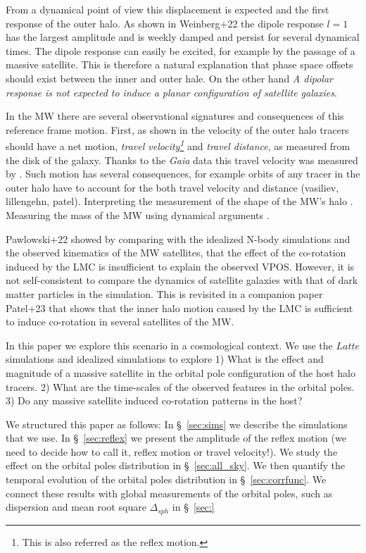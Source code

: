 \documentclass{aastex63}
\newcommand{\latte}{$Latte$}
\begin{document}
From a dynamical point of view this displacement is expected and the first response of the outer halo. As shown in Weinberg+22 the dipole response $l=1$ has the largest amplitude and is weekly damped and persist for several dynamical times. The dipole response can easily be excited, for example by the passage of a massive satellite. This is therefore a natural explanation that phase space offsets should exist between the inner and outer hale. On the other hand {\textit{A dipolar response is not expected to induce a planar configuration of satellite galaxies}}. 


In the MW there are several observational signatures and consequences of this reference frame motion. First, as shown in \cite{garavito-camargo19a, Petersen19-disk}
the velocity of the outer halo tracers should have a net motion, {\textit{travel velocity\footnote{This is also referred as the reflex motion.}}} and {\textit{travel distance}}, as measured from the disk of the galaxy. Thanks to the {\textit{Gaia}} data this travel velocity was measured by \cite{Peterson20, Erkal20b}. Such motion has several consequences, for example orbits of any tracer in the outer halo have to account for the both travel velocity and distance (vasiliev, lillengehn, patel).  Interpreting the measurement of the shape of the MW's halo \citep{GC20}. Measuring the mass of the MW using dynamical arguments \cite{Erktal, Chamberlain}. 

Pawlowski+22 showed by comparing with the idealized N-body simulations and the
observed kinematics of the MW satellites, that the effect of the co-rotation
induced by the LMC is insufficient to explain the observed VPOS. However, it is
not self-consistent to compare the dynamics of satellite galaxies with that of
dark matter particles in the simulation. This is revisited in a companion paper Patel+23 that shows that the inner halo motion caused by the LMC is sufficient to induce co-rotation in several satellites of the MW. 


In this paper we explore this scenario in a cosmological context. We use 
the \latte simulations and idealized simulations to explore 1) What is 
the effect and magnitude  of a massive satellite in the orbital pole 
configuration of the host halo tracers. 2) What are the time-scales of 
the observed features in the orbital poles. 3) Do any massive satellite induced
co-rotation patterns in the host? 

We structured this paper as follows: In \S~\ref{sec:sims} we describe the
simulations that we use. In \S~\ref{sec:reflex} we present the amplitude of 
the reflex motion (we need to decide how to call it, reflex motion or travel velocity!).
We study the effect on the orbital poles distribution in \S~\ref{sec:all_sky}. We then 
quantify the temporal evolution of the orbital poles distribution in \S~\ref{sec:corrfunc}. 
We connect these results with global measurements of the orbital poles, such as dispersion and 
mean root square $\Delta_{sph}$ in \S~\ref{sec:}
\end{document}
